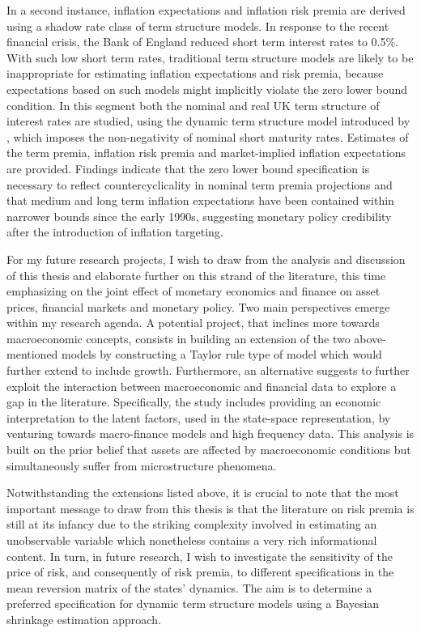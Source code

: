 In a second instance, inflation expectations and inflation risk premia are derived using a shadow rate class of term structure models. In response to the recent financial crisis, the Bank of England reduced short term interest rates to 0.5\%. With such low short term rates, traditional term structure models are likely to be inappropriate for estimating inflation expectations and risk premia, because expectations based on such models might implicitly violate the zero lower bound condition. In this segment both the nominal and real UK term structure of interest rates are studied, using the dynamic term structure model introduced by \cite{christensen_2013}, which imposes the non-negativity of nominal short maturity rates. Estimates of the term premia, inflation risk premia and market-implied inflation expectations are provided. Findings indicate that the zero lower bound specification is necessary to reflect countercyclicality in nominal term premia projections and that medium and long term inflation expectations have been contained within narrower bounds since the early 1990s, suggesting monetary policy credibility after the introduction of inflation targeting.

For my future research projects, I wish to draw from the analysis and discussion of this thesis and elaborate further on this strand of the literature, this time emphasizing on the joint effect of monetary economics and finance on asset prices, financial markets and monetary policy. Two main perspectives emerge within my research agenda. A potential project, that inclines more towards macroeconomic concepts, consists in building an extension of the two above-mentioned models by constructing a Taylor rule type of model which would further extend to include growth. Furthermore, an alternative suggests to further exploit the interaction between macroeconomic and financial data to explore a gap in the literature. Specifically, the study includes providing an economic interpretation to the latent factors, used in the state-space representation, by venturing towards macro-finance models and high frequency data. This analysis is built on the prior belief that assets are affected by macroeconomic conditions but simultaneously suffer from microstructure phenomena. %

Notwithstanding the extensions listed above, it is crucial to note that the most important message to draw from this thesis is that the literature on risk premia is still at its infancy due to the striking complexity involved in estimating an unobservable variable which nonetheless contains a very rich informational content. In turn, in future research, I wish to investigate the sensitivity of the price of risk, and consequently of risk premia, to different specifications in the mean reversion matrix of the states' dynamics. The aim is to determine a preferred specification for dynamic term structure models using a Bayesian shrinkage estimation approach.

